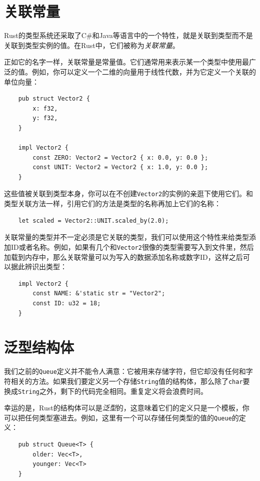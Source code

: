 \section{关联常量}
Rust的类型系统还采取了C\#和Java等语言中的一个特性，就是关联到类型而不是关联到类型实例的值。在Rust中，它们被称为\emph{关联常量}。

正如它的名字一样，关联常量是常量值。它们通常用来表示某一个类型中使用最广泛的值。例如，你可以定义一个二维的向量用于线性代数，并为它定义一个关联的单位向量：
\begin{verbatim}
    pub struct Vector2 {
        x: f32,
        y: f32,
    }

    impl Vector2 {
        const ZERO: Vector2 = Vector2 { x: 0.0, y: 0.0 };
        const UNIT: Vector2 = Vector2 { x: 1.0, y: 0.0 };
    }
\end{verbatim}

这些值被关联到类型本身，你可以在不创建\texttt{Vector2}的实例的亲逛下使用它们。和类型关联方法一样，引用它们的方法是类型的名称再加上它们的名称：
\begin{verbatim}
    let scaled = Vector2::UNIT.scaled_by(2.0);
\end{verbatim}

关联常量的类型并不一定必须是它关联的类型，我们可以使用这个特性来给类型添加ID或者名称。例如，如果有几个和\texttt{Vector2}很像的类型需要写入到文件里，然后加载到内存中，那么关联常量可以为写入的数据添加名称或数字ID，这样之后可以据此辨识出类型：
\begin{verbatim}
    impl Vector2 {
        const NAME: &'static str = "Vector2";
        const ID: u32 = 18;
    }
\end{verbatim}

\section{泛型结构体}

我们之前的\texttt{Queue}定义并不能令人满意：它被用来存储字符，但它却没有任何和字符相关的方法。如果我们要定义另一个存储\texttt{String}值的结构体，那么除了\texttt{char}要换成\texttt{String}之外，剩下的代码完全相同。重复定义将会浪费时间。

幸运的是，Rust的结构体可以是\emph{泛型}的，这意味着它们的定义只是一个模板，你可以把任何类型塞进去。例如，这里有一个可以存储任何类型的值的\texttt{Queue}的定义：
\begin{verbatim}
    pub struct Queue<T> {
        older: Vec<T>,
        younger: Vec<T>
    }
\end{verbatim}

